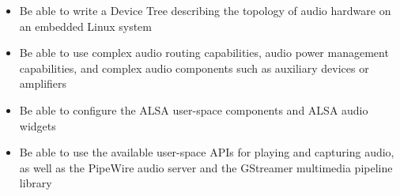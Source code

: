 {{\begin{itemize}
      role of the different drivers and the Device Tree representation
    \item Be able to write a Device Tree describing the topology of
      audio hardware on an embedded Linux system
    \item Be able to use complex audio routing capabilities, audio power
      management capabilities, and complex audio components such as
      auxiliary devices or amplifiers
    \item Be able to configure the ALSA user-space components and
      ALSA audio widgets
    \item Be able to use the available user-space APIs for playing and
    capturing audio, as well as the PipeWire audio server and the
    GStreamer multimedia pipeline library
  \end{itemize}
}
}

\def \trainingprerequisites{
  \begin{itemize}
    \prerequisitecommandline
    \prerequisiteembeddedlinux
    \prerequisiteenglish
  \end{itemize}
}


\def \trainers {
  \ifthenelse{\equal{\agendalanguage}{french}}{
    Un des ingénieurs suivants
  }{
    One of the following engineers
  }\\
  \vspace{-12pt}
  \begin{itemize}
  \item \href{https://bootlin.com/company/staff/alexandre-belloni/}{Alexandre Belloni}
  \end{itemize}
}

